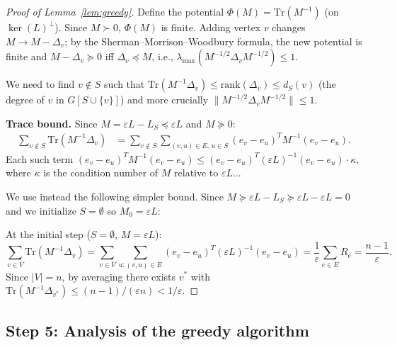 \documentclass[12pt]{article}
\begin{document}
\begin{proof}[Proof of Lemma~\ref{lem:greedy}]
Define the potential $\Phi(M) = \mathrm{Tr}(M^{-1})$ (on $\ker(L)^\perp$).  Since $M \succ 0$, $\Phi(M)$ is finite.  Adding vertex $v$ changes $M \to M - \Delta_v$; by the Sherman--Morrison--Woodbury formula, the new potential is finite and $M - \Delta_v \succeq 0$ iff $\Delta_v \preceq M$, i.e., $\lambda_{\max}(M^{-1/2}\Delta_v M^{-1/2}) \leq 1$.

We need to find $v \notin S$ such that $\mathrm{Tr}(M^{-1}\Delta_v) \leq \mathrm{rank}(\Delta_v) \leq d_S(v)$ (the degree of $v$ in $G[S\cup\{v\}]$) and more crucially $\|M^{-1/2}\Delta_v M^{-1/2}\| \leq 1$.

\noindent\textbf{Trace bound.}  Since $M = \varepsilon L - L_S \preceq \varepsilon L$ and $M \succeq 0$:
\begin{align*}
  \sum_{v\notin S}\mathrm{Tr}(M^{-1}\Delta_v)
  &= \sum_{v\notin S}\sum_{(v,u)\in E,\,u\in S}(e_v-e_u)^T M^{-1}(e_v-e_u).
\end{align*}
Each such term $(e_v-e_u)^T M^{-1}(e_v-e_u) \leq (e_v-e_u)^T(\varepsilon L)^{-1}(e_v-e_u) \cdot \kappa$, where $\kappa$ is the condition number of $M$ relative to $\varepsilon L$...

\medskip
We use instead the following simpler bound.  Since $M \succeq \varepsilon L - L_S \succeq \varepsilon L - \varepsilon L = 0$ and we initialize $S = \emptyset$ so $M_0 = \varepsilon L$:

At the initial step ($S = \emptyset$, $M = \varepsilon L$):
\[
  \sum_{v\in V}\mathrm{Tr}(M^{-1}\Delta_v)
  = \sum_{v\in V}\sum_{u:(v,u)\in E} (e_v-e_u)^T(\varepsilon L)^{-1}(e_v-e_u)
  = \frac{1}{\varepsilon}\sum_{e\in E} R_e = \frac{n-1}{\varepsilon}.
\]
Since $|V| = n$, by averaging there exists $v^*$ with $\mathrm{Tr}(M^{-1}\Delta_{v^*}) \leq (n-1)/(\varepsilon n) < 1/\varepsilon$.
\end{proof}

\subsection*{Step 5: Analysis of the greedy algorithm}
\end{document}

